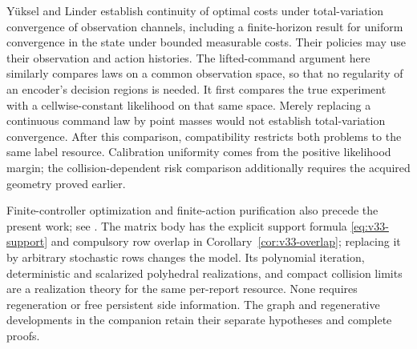 Y\"uksel and Linder \cite[Theorems 3.4 and 6.2]{YLChannels2012}
establish continuity of optimal costs under total-variation convergence
of observation channels, including a finite-horizon result for uniform
convergence in the state under bounded measurable costs. Their policies
may use their observation and action histories. The lifted-command
argument here similarly compares laws on a common observation space,
so that no regularity of an encoder's decision regions is needed. It
first compares the true experiment with a cellwise-constant likelihood
on that same space. Merely replacing a continuous command law by point
masses would not establish total-variation convergence. After this
comparison, compatibility restricts both problems to the same label
resource. Calibration uniformity comes from the positive likelihood
margin; the collision-dependent risk comparison additionally requires
the acquired geometry proved earlier.

Finite-controller optimization and finite-action purification also
precede the present work; see \cite{V32Amato,DWW1951}. The matrix body
has the explicit support formula \eqref{eq:v33-support} and compulsory
row overlap in Corollary~\ref{cor:v33-overlap}; replacing it by arbitrary
stochastic rows changes the model. Its polynomial iteration, deterministic
and scalarized polyhedral realizations, and compact collision limits
are a realization theory for the same per-report resource. None requires
regeneration or free persistent side information. The graph and
regenerative developments in the companion retain their separate
hypotheses and complete proofs.
